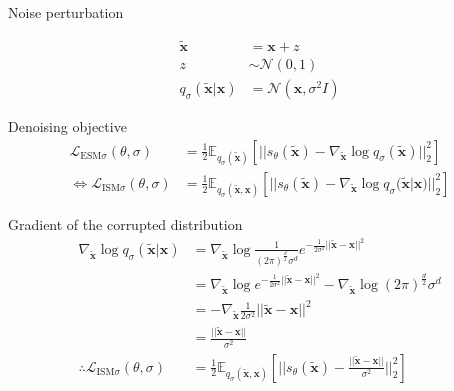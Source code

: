 \documentclass[aspectratio=169,xcolor=dvipsnames]{beamer}
\newcommand{\bx}{\mathbf{x}}
\newcommand{\btx}{\mathbf{\tilde{x}}}
\newcommand{\qs}{q_{\sigma}}
\newcommand{\nbtx}{\nabla_{\btx}}
\begin{document}
\begin{frame}{Noise perturbation}

\begin{align*}
  \btx &= \bx + z\\
  z &\sim \mathcal{N}(0, 1)\\
    \qs(\btx | \bx) &= \mathcal{N}(\bx, \sigma^2 I)
  \end{align*}
\end{frame}

\begin{frame}{Denoising objective}
  \begin{align*}
    \mathcal{L}_{\text{ESM} \sigma}(\theta, \sigma) &= \frac{1}{2} \mathbb{E}_{\qs(\btx)} \left[|| s_\theta(\btx) - \nbtx \log q_\sigma(\btx) ||_2^2 \right]\\
    \iff \mathcal{L}_{\text{ISM} \sigma}(\theta, \sigma) &= \frac{1}{2} \mathbb{E}_{\qs(\btx, \bx)} \left[ ||s_\theta(\btx) - \nbtx \log q_{\sigma} (\btx | \bx) ||_2^2 \right]
  \end{align*}
\end{frame}

\begin{frame}{Gradient of the corrupted distribution}
  \begin{align*}
    \nbtx \log \qs (\btx | \bx) &= \nbtx \log \frac{1}{(2\pi)^{\frac{d}{2}}  \sigma^d} e^{-\frac{1}{2 \sigma^2} || \btx - \bx||^2}\\
                        &= \nbtx \log e^{-\frac{1}{2 \sigma^2} || \btx - \bx||^2} - \nbtx \log (2\pi)^{\frac{d}{2}} \sigma^d\\
                        &= - \nbtx \frac{1}{2 \sigma^2} || \btx - \bx||^2\\
                        &= \frac{|| \btx - \bx||}{\sigma^2}\\
    \therefore \mathcal{L}_{\text{ISM} \sigma}(\theta, \sigma) &= \frac{1}{2} \mathbb{E}_{\qs(\btx, \bx)} \left[ ||s_\theta(\btx) -  \frac{|| \btx - \bx||}{\sigma^2} ||_2^2 \right]
  \end{align*}
\end{frame}
\end{document}
